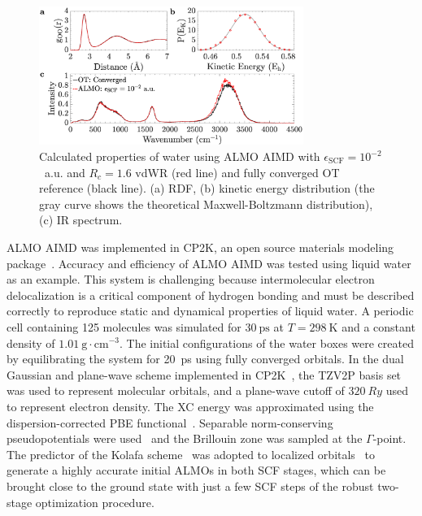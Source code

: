 \documentclass[aip,jcp,reprint,amsmath,amssymb]{revtex4-1}
\begin{document}
\begin{figure}
\includegraphics[trim={1.3cm 0.1cm 3.3cm 1.3cm},clip,width=8.6cm]{1.eps}
\caption{\label{fig:dynproperties} 
Calculated properties of water using ALMO AIMD with $\epsilon_{\text{SCF}} = 10^{-2}$~a.u. and $R_{c} = 1.6$ vdWR (red line) and fully converged OT reference (black line).
(a) RDF, 
(b) kinetic energy distribution (the gray curve shows the theoretical Maxwell-Boltzmann distribution), 
(c) IR spectrum.
}
\end{figure}

ALMO AIMD was implemented in CP2K, an open source materials modeling package~\cite{www:cp2k}. 
Accuracy and efficiency of ALMO AIMD was tested using liquid water as an example. 
This system is challenging because intermolecular electron delocalization is a critical component of hydrogen bonding and must be described correctly to reproduce static and dynamical properties of liquid water. 
A periodic cell containing 125 molecules was simulated for $\SI{30}{\ps}$ at $T=\SI{298}{\K}$ and a constant density of $\SI{1.01}{\g\cdot\cm^{-3}}$. 
The initial configurations of the water boxes were created by equilibrating the system for 20~ps using fully converged orbitals. 
%
In the dual Gaussian and plane-wave scheme implemented in CP2K~\cite{a:quickstep}, the TZV2P basis set was used to represent molecular orbitals, and a plane-wave cutoff of $\SI{320}{Ry}$ used to represent electron density. 
The XC energy was approximated using the dispersion-corrected PBE functional~\cite{a:pbe,Grimme2010}. 
Separable norm-conserving pseudopotentials were used~\cite{a:hgh} and the Brillouin zone was sampled at the $\Gamma$-point. 
The predictor of the Kolafa scheme~\cite{Kolafa2003} was adopted to localized orbitals~\cite{a:2ndcpmd} to generate a highly accurate initial ALMOs in both SCF stages, which can be brought close to the ground state with just a few SCF steps of the robust two-stage optimization procedure. 
\end{document}
